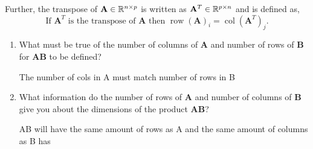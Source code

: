 \documentclass{homework}
\DeclareMathOperator{\row}{row}
\DeclareMathOperator{\col}{col}
\begin{document}
Further, the transpose of $\mathbf{A} \in \mathbb{R}^{n\times p}$ is
written as $\mathbf{A}^T \in \mathbb{R}^{p\times n}$ and is defined as,
\[
  \text{If } \mathbf{A}^T \text{ is the transpose of } \mathbf{A} \text{ then } \row(\mathbf{A})_i = \col(\mathbf{A}^T)_j.
\]
\begin{enumerate}[label=(\alph*)]
  \item What must be true of the number of columns of $\mathbf{A}$ and
        number of rows of $\mathbf{B}$ for $\mathbf{AB}$ to be defined?

        \begin{sol}
          The number of cols in A must match number of rows in B
        \end{sol}

  \item What information do the number of rows of $\mathbf{A}$ and number
        of columns of $\mathbf{B}$ give you about the dimensions of the
        product $\mathbf{AB}$?

        \begin{sol}
          AB will have the same amount of rows as A and the same amount of columns as B has
        \end{sol}


\end{enumerate}
\end{document}
